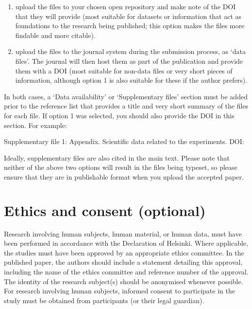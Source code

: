 \documentclass[cm,linguex]{glossa}
\begin{document}
\begin{enumerate}
\def\labelenumi{\arabic{enumi}.}
\item
  upload the files to your chosen open repository and make note of the
  DOI that they will provide (most suitable for datasets or information
  that act as foundations to the research being published; this option
  makes the files more findable and more citable).
\item
  upload the files to the journal system during the submission process,
  as `data files'. The journal will then host them as part of the
  publication and provide them with a DOI (most suitable for non-data
  files or very short pieces of information, although option 1 is also
  suitable for these if the author prefers).
\end{enumerate}

In both cases, a `Data availability' or `Supplementary files' section
must be added prior to the reference list that provides a title and very
short summary of the files for each file. If option 1 was selected, you
should also provide the DOI in this section. For example:

Supplementary file 1: Appendix. Scientific data related to the
experiments. DOI:

Ideally, supplementary files are also cited in the main text. Please
note that neither of the above two options will result in the files
being typeset, so please ensure that they are in publishable format when
you upload the accepted paper.

\hypertarget{ethics-and-consent-optional}{%
\section*{Ethics and consent
(optional)}\label{ethics-and-consent-optional}}

Research involving human subjects, human material, or human data, must
have been performed in accordance with the Declaration of Helsinki.
Where applicable, the studies must have been approved by an appropriate
ethics committee. In the published paper, the authors should include a
statement detailing this approval, including the name of the ethics
committee and reference number of the approval. The identity of the
research subject(s) should be anonymised whenever possible. For research
involving human subjects, informed consent to participate in the study
must be obtained from participants (or their legal guardian).
\end{document}
